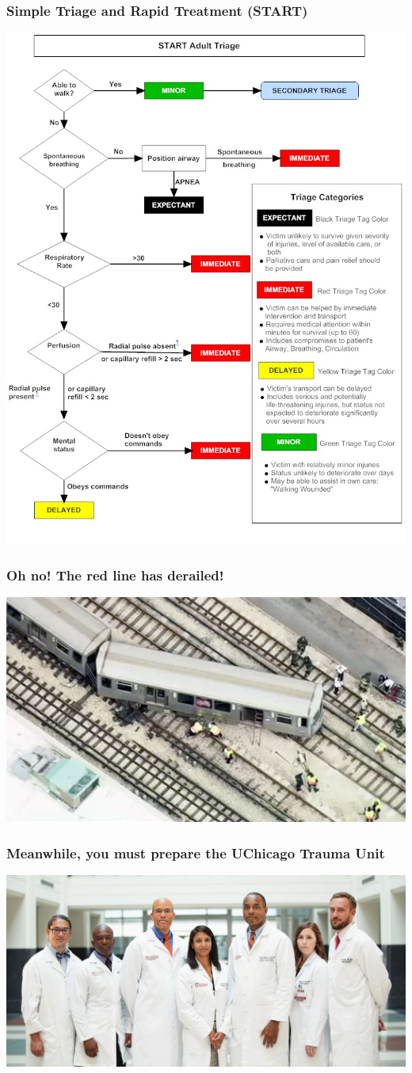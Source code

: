 \documentclass{beamer}
\begin{document}
\begin{frame}
  \frametitle{Simple Triage and Rapid Treatment (START)}
  \centering
  \includegraphics[width=.5\textwidth]{StartAdultTriageAlgorithm}
\end{frame}

\begin{frame}
  \frametitle{Oh no! The red line has derailed!}
  \includegraphics[width=1\textwidth]{train_derailed}
\end{frame}


\begin{frame}
  \frametitle{Meanwhile, you must prepare the UChicago Trauma Unit}
  \includegraphics[width=1\textwidth]{uchicago_trama}
\end{frame}
\end{document}
